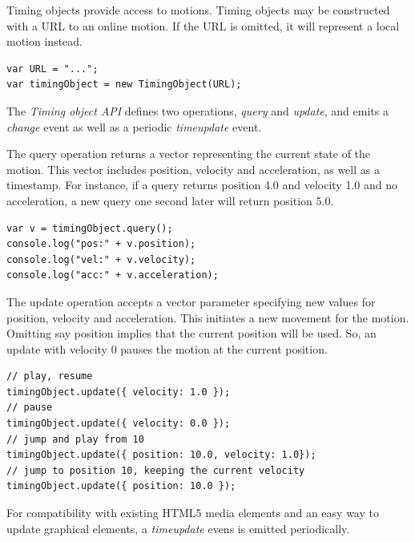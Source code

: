 Timing objects provide access to motions. Timing objects may be constructed
with a URL to an online motion. If the URL is omitted, it will represent a
local motion instead.

\begin{lstlisting}[caption=Constructing a timing object.]
var URL = "...";
var timingObject = new TimingObject(URL);
\end{lstlisting}

The \emph{Timing object API} defines two operations, \emph{query} and
\emph{update}, and emits a \emph{change} event as well as a periodic
\emph{timeupdate} event.



The query operation returns a vector representing the current state of the
motion. This vector includes position, velocity and acceleration, as well as a
timestamp. For instance, if a query returns position 4.0 and velocity 1.0 and no acceleration, a
new query one second later will return position 5.0.

\begin{lstlisting}[caption=Querying the timing object to get a snapshot vector.]
var v = timingObject.query();
console.log("pos:" + v.position);
console.log("vel:" + v.velocity);
console.log("acc:" + v.acceleration);
\end{lstlisting}



The update operation accepts a vector parameter specifying new values for
position, velocity and acceleration. This initiates a new movement for the
motion. Omitting say position implies that the current position will be used.
So, an update with velocity 0 pauses the motion at the current position.

\begin{lstlisting}[caption=Updating the timing object.]
// play, resume
timingObject.update({ velocity: 1.0 }); 
// pause
timingObject.update({ velocity: 0.0 });
// jump and play from 10
timingObject.update({ position: 10.0, velocity: 1.0});
// jump to position 10, keeping the current velocity
timingObject.update({ position: 10.0 });
\end{lstlisting}



For compatibility with existing HTML5 media elements and an easy way to update graphical elements, a \emph{timeupdate} evens is emitted periodically.


